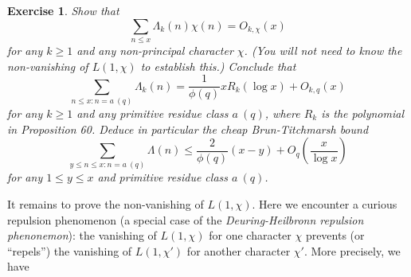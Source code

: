 \documentclass[10pt,reqno]{amsart}
\newtheorem{exercise}[theorem]{Exercise}
\begin{document}
\begin{exercise}
    Show that
    \[  \sum_{n \leq x} \Lambda_k(n) \chi(n) = O_{k,\chi}(x) \]
    for any $k \geq 1$ and any non-principal character $\chi$. (You will not need to know the non-vanishing of $L(1,\chi)$ to establish this.) Conclude that
    \[  \sum_{n \leq x: n = a\ (q)} \Lambda_k(n) = \frac{1}{\phi(q)} x R_k( \log x ) + O_{k,q}(x) \]
    for any $k \geq 1$ and any primitive residue class $a\ (q)$, where $R_k$ is the polynomial in Proposition 60. Deduce in particular the cheap Brun-Titchmarsh bound
    \[  \sum_{y \leq n \leq x: n = a\ (q)} \Lambda(n) \leq \frac{2}{\phi(q)}(x - y) + O_q \left( \frac{x}{\log x} \right) \]
    for any $1 \leq y \leq x$ and primitive residue class $a\ (q)$.
\end{exercise}

It remains to prove the non-vanishing of $L(1,\chi)$. Here we encounter a curious repulsion phenomenon (a special case of the \emph{Deuring-Heilbronn repulsion phenonemon}): the vanishing of $L(1,\chi)$ for one character $\chi$ prevents (or “repels”) the vanishing of $L(1,\chi')$ for another character $\chi'$. More precisely, we have
\end{document}

